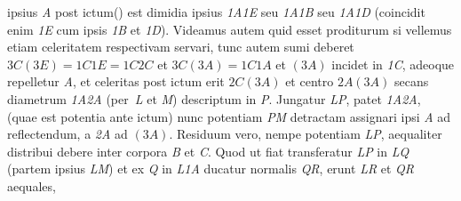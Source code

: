 \protect{} ipsius \textit{A} post ictum\protect\vphantom() est dimidia
%
ipsius \textit{{\scriptsize1}A{\scriptsize1}E} seu \textit{{\scriptsize1}A{\scriptsize1}B} seu 
%
 \textit{{\scriptsize1}A{\scriptsize1}D} (coincidit enim \textit{{\scriptsize1}E} cum ipsis \textit{{\scriptsize1}B} et \textit{{\scriptsize1}D}). 
\pend
%
\pstart
Videamus autem quid esset proditurum si vellemus etiam celeritatem respectivam%
\protect{} servari, tunc autem sumi deberet 
%
${\scriptstyle \textit{3}}C({\scriptstyle \textit{3}}E)={\scriptstyle \textit{1}}C{\scriptstyle \textit{1}}E={\scriptstyle \textit{1}}C{\scriptstyle \textit{2}}C$ et  
%
${\scriptstyle \textit{3}}C({\scriptstyle \textit{3}}A)={\scriptstyle \textit{1}}C{\scriptstyle \textit{1}}A$ et $({\scriptstyle \textit{3}}A)$ incidet  
%
in \textit{{\scriptsize1}C}, adeoque repelletur \textit{A},  
%
%
 et celeritas post ictum erit ${\scriptstyle \textit{2}}C({\scriptstyle \textit{3}}A)$ et centro  
%
%
 ${\scriptstyle \textit{2}}A({\scriptstyle \textit{3}}A)$  
%
 secans  
%
%
 diametrum \textit{{\scriptsize1}A{\scriptsize2}A} (per~\textit{L} et \textit{M}) descriptum in \textit{P}. Jungatur \textit{LP}, patet  
%
%
\textit{{\scriptsize1}A{\scriptsize2}A}, (quae est %
potentia\protect{} ante ictum)%
\protect{} nunc potentiam%
\protect{} \textit{PM} detractam assignari  
%
ipsi \textit{A} ad reflectendum, a \textit{{\scriptsize2}A} ad $({\scriptstyle \textit{3}}A)$. Residuum vero, nempe potentiam%
\protect{}  
%
\textit{LP}, aequaliter distribui debere inter corpora \textit{B} et \textit{C}. Quod ut fiat transferatur \textit{LP} in \textit{LQ} 
%
(partem ipsius \textit{LM}) et ex \textit{Q} in \textit{L{\scriptsize1}A} ducatur normalis \textit{QR}, erunt \textit{LR} et \textit{QR} aequales, 
